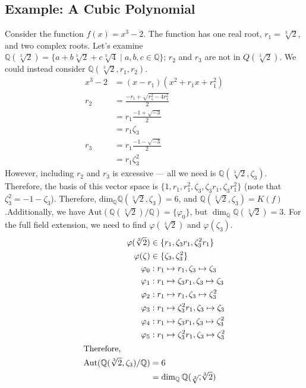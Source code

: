 \documentclass[10pt]{extarticle}
\newcommand{\Q}{\mathbb{Q}}
\begin{document}
  \subsection{Example: A Cubic Polynomial}%
  Consider the function $f(x) = x^3 - 2$. The function has one real root, $r_1=\sqrt[3]{2}$, and two complex roots. Let's examine $\Q(\sqrt[3]{2}) = \{a + b\sqrt[3]{2} + c\sqrt[3]{4}\mid a,b,c\in\Q\}$; $r_2$ and $r_3$ are not in $Q(\sqrt[3]{2})$. We could instead consider $\Q(\sqrt[3]{2},r_1,r_2)$.
  \begin{align*}
    x^3-2 &= (x-r_1)(x^2 + r_1x + r_1^2)\\
    r_2 &= \frac{-r_1 + \sqrt{r_1^2-4r_1^2}}{2}\\
        &= r_1\frac{-1+\sqrt{-3}}{2}\\
        &= r_1\zeta_3\\
    r_3 &= r_1\frac{-1 - \sqrt{-3}}{2}\\
        &= r_1\zeta_3^2
  \end{align*}
  However, including $r_2$ and $r_3$ is excessive --- all we need is $\Q(\sqrt[3]{2},\zeta_3)$. Therefore, the basis of this vector space is $\{1,r_1,r_1^2,\zeta_3,\zeta_3 r_1,\zeta_3 r_1^2\}$ (note that $\zeta_3^2 = -1-\zeta_3$). Therefore, $\text{dim}_{\Q}\Q(\sqrt[3]{2},\zeta_3)=6$, and $\Q(\sqrt[3]{2},\zeta_3) = K(f)$.Additionally, we have $\text{Aut}(\Q(\sqrt[3]{2})/\Q) = \{\varphi_0\}$, but $\dim_{\Q}\Q(\sqrt[3]{2}) = 3$. For the full field extension, we need to find $\varphi(\sqrt[3]{2})$ and $\varphi(\zeta_3)$.
  \begin{align*}
    \varphi(\sqrt[3]{2}) &\in \{r_1,\zeta_3 r_1,\zeta_3^2 r_1\}\\
    \varphi(\zeta) &\in \{\zeta_3,\zeta_3^2\}\\
    \varphi_0 &: r_1\mapsto r_1,\zeta_3\mapsto \zeta_3\\
    \varphi_1 &: r_1\mapsto \zeta_3r_1,\zeta_3\mapsto \zeta_3\\
    \varphi_2 &: r_1\mapsto r_1,\zeta_3\mapsto \zeta_3^2\\
    \varphi_3 &: r_1\mapsto \zeta_3^2r_1,\zeta_3\mapsto \zeta_3\\
    \varphi_4 &: r_1\mapsto \zeta_3r_1,\zeta_3\mapsto \zeta_3^2\\
    \varphi_5 &: r_1\mapsto \zeta_3^2r_1,\zeta_3\mapsto \zeta_3^2\\
    \shortintertext{Therefore,}
    \text{Aut}(\Q(\sqrt[3]{2},\zeta_3)/\Q) &= 6\\
                                           &= \dim_{\Q}\Q(\sqrt[3],\sqrt[3]{2})
  \end{align*}
\end{document}
